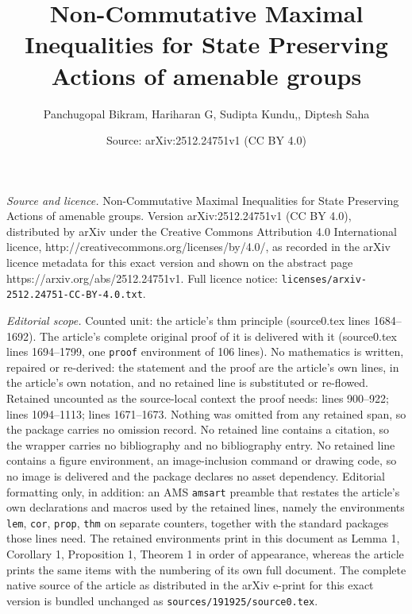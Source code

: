 \documentclass[10pt,a4paper]{amsart}
\title{Non-Commutative Maximal Inequalities for State Preserving Actions of amenable groups}
\author{Panchugopal Bikram, Hariharan G, Sudipta Kundu,, Diptesh Saha}
\date{Source: arXiv:2512.24751v1 (CC BY 4.0)}
\begin{document}
\maketitle

\noindent\emph{Source and licence.} Non-Commutative Maximal Inequalities for State Preserving Actions of amenable groups. Version arXiv:2512.24751v1 (CC BY 4.0), distributed by arXiv under the Creative Commons Attribution 4.0 International licence, http://creativecommons.org/licenses/by/4.0/, as recorded in the arXiv licence metadata for this exact version and shown on the abstract page https://arxiv.org/abs/2512.24751v1. Full licence notice: \texttt{licenses/arxiv-2512.24751-CC-BY-4.0.txt}.\par\smallskip

\noindent\textit{Editorial scope.} Counted unit: the article's thm principle (source0.tex lines 1684--1692). The article's complete original proof of it is delivered with it (source0.tex lines 1694--1799, one \texttt{proof} environment of 106 lines). No mathematics is written, repaired or re-derived: the statement and the proof are the article's own lines, in the article's own notation, and no retained line is substituted or re-flowed.  Retained uncounted as the source-local context the proof needs: lines 900--922; lines 1094--1113; lines 1671--1673.  Nothing was omitted from any retained span, so the package carries no omission record.  No retained line contains a citation, so the wrapper carries no bibliography and no bibliography entry.  No retained line contains a figure environment, an image-inclusion command or drawing code, so no image is delivered and the package declares no asset dependency.  Editorial formatting only, in addition: an AMS \texttt{amsart} preamble that restates the article's own declarations and macros used by the retained lines, namely the environments \texttt{lem}, \texttt{cor}, \texttt{prop}, \texttt{thm} on separate counters, together with the standard packages those lines need.  The retained environments print in this document as Lemma 1, Corollary 1, Proposition 1, Theorem 1 in order of appearance, whereas the article prints the same items with the numbering of its own full document.  The complete native source of the article as distributed in the arXiv e-print for this exact version is bundled unchanged as \texttt{sources/191925/source0.tex}.
\end{document}

